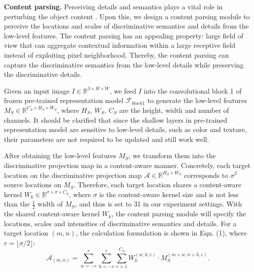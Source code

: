 \documentclass[letterpaper]{article} %
\begin{document}
\textbf{Content parsing.} Perceiving details and semantics plays a vital role in perturbing the object content \cite{DBLP:conf/mm/WangWLO20,DBLP:conf/aaai/WangLWO21, DBLP:conf/icmcs/WangWZLL19}. Upon this, we design a content parsing module to perceive the locations and scales of discriminative semantics and details from the low-level features. The content parsing has an appealing property: large field of view that can aggregate contextual information within a large receptive field instead of exploiting pixel neighborhood. Thereby, the content parsing can capture the discriminative semantics from the low-level details while preserving the discriminative details.

 
Given an input image $ I \in \mathbb{R}^{3\times H \times W} $, we  feed $ I $ into the convolutional block 1 of frozen pre-trained representation model $ \mathcal{F}_{block1} $ to generate the low-level features $ M_S \in\mathbb{R}^{C_S \times H_S \times W_S} $, where $ H_S $, $W_S $, $ C_S $ are the height, width and number of channels. It should be clarified that since the shallow layers in pre-trained representation model are sensitive to low-level details, such as color and texture, their parameters are not required to be updated and still work well.





After obtaining the low-level features $ M_S $, we transform them into the discriminative projection map in a content-aware manner. Concretely, each target location on the discriminative projection map $ \mathcal{A} \in \mathbb{R}^{H_S \times W_S} $ corresponds to $ \sigma^2 $ source locations on $ M_S $. Therefore, each target location shares a content-aware kernel $ W_k \in \mathbb{R}^{ \sigma \times \sigma \times C_S } $, where $ \sigma $ is the content-aware kernel size and is not less than the $ \frac{1}{2} $ width of $ M_S $, and thus is set to 31 in our experiment settings. With the shared content-aware kernel $ W_k $, the content parsing module will specify the locations, scales and intensities of discriminative semantics and details. For a target location $ (m, n) $, the calculation formulation is shown in Eqn. (1), where $ r = \lfloor \sigma/2\rfloor $: 
\begin{equation}
\mathcal{A}_{(m,n)} = \sum_{w=-r}^r\sum_{h=-r}^r \sum_{c=1}^{C_S} W_k^{(w,h,c)} \cdot M_S^{(m+w, n+h,c)}.
\end{equation}
\end{document}

